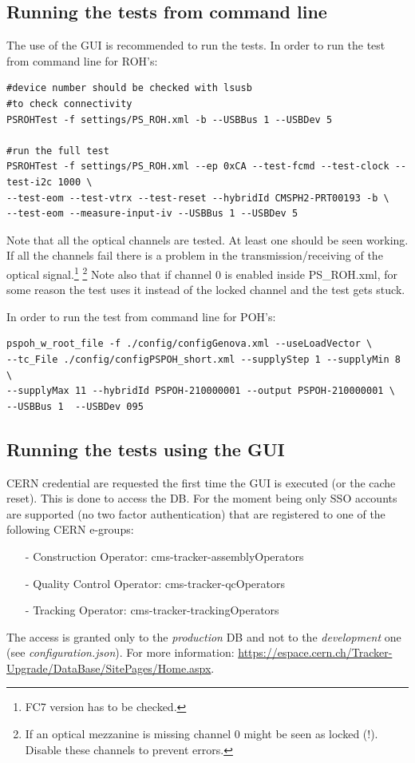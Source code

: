 \documentclass[10pt,a4paper]{article}
\begin{document}
\subsection{Running the tests from command line}
The use of the GUI is recommended to run the tests. 
In order to run the test from command line for ROH's:
\begin{framed}
\begin{verbatim}
#device number should be checked with lsusb
#to check connectivity
PSROHTest -f settings/PS_ROH.xml -b --USBBus 1 --USBDev 5 

#run the full test
PSROHTest -f settings/PS_ROH.xml --ep 0xCA --test-fcmd --test-clock --test-i2c 1000 \
--test-eom --test-vtrx --test-reset --hybridId CMSPH2-PRT00193 -b \
--test-eom --measure-input-iv --USBBus 1 --USBDev 5
\end{verbatim}
\end{framed}
Note that all the optical channels are tested. At least one should be seen working.
If all the channels fail there is a problem in the transmission/receiving of the optical signal.\footnote[1]{FC7 version has to be checked.}
\footnote[2]{If an optical mezzanine is missing channel 0 might be seen as locked (!). Disable these channels to prevent errors.}
Note also that if channel 0 is enabled inside PS\_ROH.xml, for some reason the test uses it instead of the locked channel and the test gets stuck.  

In order to run the test from command line for POH's:
\begin{framed}
\begin{verbatim}
pspoh_w_root_file -f ./config/configGenova.xml --useLoadVector \
--tc_File ./config/configPSPOH_short.xml --supplyStep 1 --supplyMin 8 \
--supplyMax 11 --hybridId PSPOH-210000001 --output PSPOH-210000001 \
--USBBus 1  --USBDev 095
\end{verbatim}
\end{framed}

\subsection{Running the tests using the GUI}

CERN credential are requested the first time the GUI is executed (or the cache reset). This is done to access the DB. For the moment being only SSO accounts are supported (no two factor authentication) that are registered to one of the following CERN e-groups:
\begin{itemize}
\item[-] Construction Operator: cms-tracker-assemblyOperators
\item[-] Quality Control Operator: cms-tracker-qcOperators
\item[-] Tracking Operator: cms-tracker-trackingOperators
\end{itemize}
The access is granted only to the {\it production} DB and not to the {\it development} one (see \emph{configuration.json}). For more information:
\url{https://espace.cern.ch/Tracker-Upgrade/DataBase/SitePages/Home.aspx}.
\end{document}
